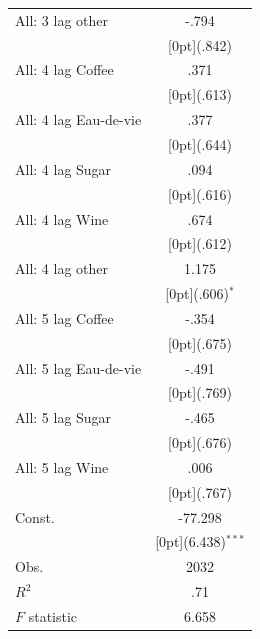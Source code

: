 \documentclass[12pt,a4paper,titlepage]{article}
\begin{document}
{\begin{tabular*}{\textwidth}{@{\extracolsep{\fill}}lc}
All: 3 lag other &	-.794 \\
&	\raisebox{.7ex}[0pt]{\scriptsize (.842)} \\
All: 4 lag Coffee &	.371 \\
&	\raisebox{.7ex}[0pt]{\scriptsize (.613)} \\
All: 4 lag Eau-de-vie &	.377 \\
&	\raisebox{.7ex}[0pt]{\scriptsize (.644)} \\
All: 4 lag Sugar &	.094 \\
&	\raisebox{.7ex}[0pt]{\scriptsize (.616)} \\
All: 4 lag Wine &	.674 \\
&	\raisebox{.7ex}[0pt]{\scriptsize (.612)} \\
All: 4 lag other &	1.175 \\
&	\raisebox{.7ex}[0pt]{\scriptsize (.606)$^{*}$} \\
All: 5 lag Coffee &	-.354 \\
&	\raisebox{.7ex}[0pt]{\scriptsize (.675)} \\
All: 5 lag Eau-de-vie &	-.491 \\
&	\raisebox{.7ex}[0pt]{\scriptsize (.769)} \\
All: 5 lag Sugar &	-.465 \\
&	\raisebox{.7ex}[0pt]{\scriptsize (.676)} \\
All: 5 lag Wine &	.006 \\
&	\raisebox{.7ex}[0pt]{\scriptsize (.767)} \\
Const. &	-77.298 \\
&	\raisebox{.7ex}[0pt]{\scriptsize (6.438)$^{***}$} \\
Obs. &	2032 \\
$ R^2$ &	.71 \\
$ F$ statistic &	6.658 \\
\hline\hline	
\end{tabular*}%


}
\end{document}
